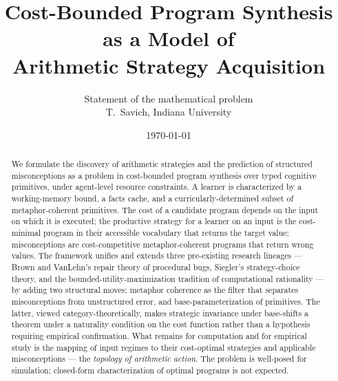 \documentclass[11pt]{article}
\title{Cost-Bounded Program Synthesis as a Model of\\
       Arithmetic Strategy Acquisition}
\author{Statement of the mathematical problem\\
\small T.\ Savich, Indiana University}
\date{\today}
\begin{document}
\maketitle

\noindent{}
\bigskip

\begin{abstract}
We formulate the discovery of arithmetic strategies and the prediction
of structured misconceptions as a problem in cost-bounded program
synthesis over typed cognitive primitives, under agent-level resource
constraints. A learner is characterized by a working-memory bound, a
facts cache, and a curricularly-determined subset of metaphor-coherent
primitives. The cost of a candidate program depends on the input on
which it is executed; the productive strategy for a learner on an input
is the cost-minimal program in their accessible vocabulary that returns
the target value; misconceptions are cost-competitive
metaphor-coherent programs that return wrong values. The framework
unifies and extends three pre-existing research lineages — Brown and
VanLehn's repair theory of procedural bugs, Siegler's strategy-choice
theory, and the bounded-utility-maximization tradition of computational
rationality — by adding two structural moves: metaphor coherence as the
filter that separates misconceptions from unstructured error, and
base-parameterization of primitives. The latter, viewed
category-theoretically, makes strategic invariance under base-shifts a
theorem under a naturality condition on the cost function rather than a
hypothesis requiring empirical confirmation. What remains for
computation and for empirical study is the mapping of input regimes to
their cost-optimal strategies and applicable misconceptions — the
\emph{topology of arithmetic action}. The problem is well-posed for
simulation; closed-form characterization of optimal programs is not
expected.
\end{abstract}
\end{document}
